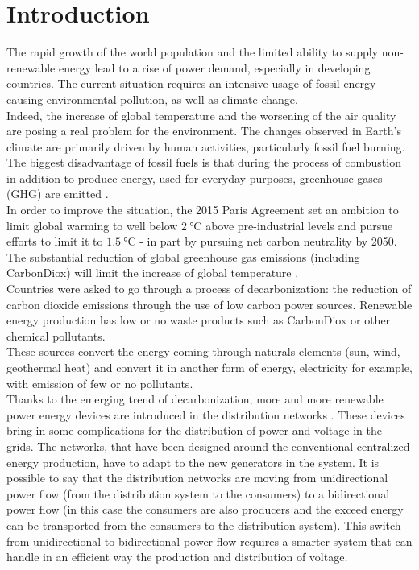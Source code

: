 \chapter{Introduction}

%
The rapid growth of the world population and the limited ability to supply non-renewable energy lead to a rise of power demand, especially in developing countries. The current situation requires an intensive usage of fossil energy causing environmental pollution, as well as climate change. \\

Indeed, the increase of global temperature and the worsening of the air quality are posing a real problem for the environment. The changes observed in Earth’s climate are primarily driven by human activities, particularly fossil fuel burning. The biggest disadvantage of fossil fuels is that during the process of combustion in addition to produce energy, used for everyday purposes, greenhouse gases (\gls{GHG}) are emitted \cite{greenhousegasemissions}. \\

In order to improve the situation, the 2015 Paris Agreement set an ambition to limit global warming to well below $\SI{2}{\degreeCelsius}$ above pre-industrial levels and pursue efforts to limit it to $\SI{1.5}{\degreeCelsius}$ - in part by pursuing net carbon neutrality by 2050. The substantial reduction of global greenhouse gas emissions (including \gls{CarbonDiox})  will limit the increase of global temperature \cite{french_conference}. \\
Countries were asked to go through a process of decarbonization: the reduction of carbon dioxide emissions through the use of low carbon power sources. Renewable energy production has low or no waste products such as \gls{CarbonDiox} or other chemical pollutants.  \\
These sources convert the energy coming through naturals elements (sun, wind, geothermal heat) and convert it in another form of energy, electricity for example, with emission of few or no pollutants.\\

Thanks to the emerging trend of decarbonization, more and more renewable power energy devices are introduced in the distribution networks \cite{owidenergy}. These devices bring in some complications for the distribution of power and voltage in the grids. The networks, that have been designed around the conventional centralized energy production, have to adapt to the new generators in the system. It is possible to say that the distribution networks are moving from unidirectional power flow (from the distribution system to the consumers) to a bidirectional power flow (in this case the consumers are also producers and the exceed energy can be transported from the consumers to the distribution system). This switch from unidirectional to bidirectional power flow requires a smarter system that can handle in an efficient way the production and distribution of voltage.\\


